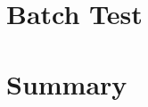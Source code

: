 \documentclass[11pt,a4paper]{article}
\begin{document}
\section{Batch Test}
\section{Summary}
\end{document}
